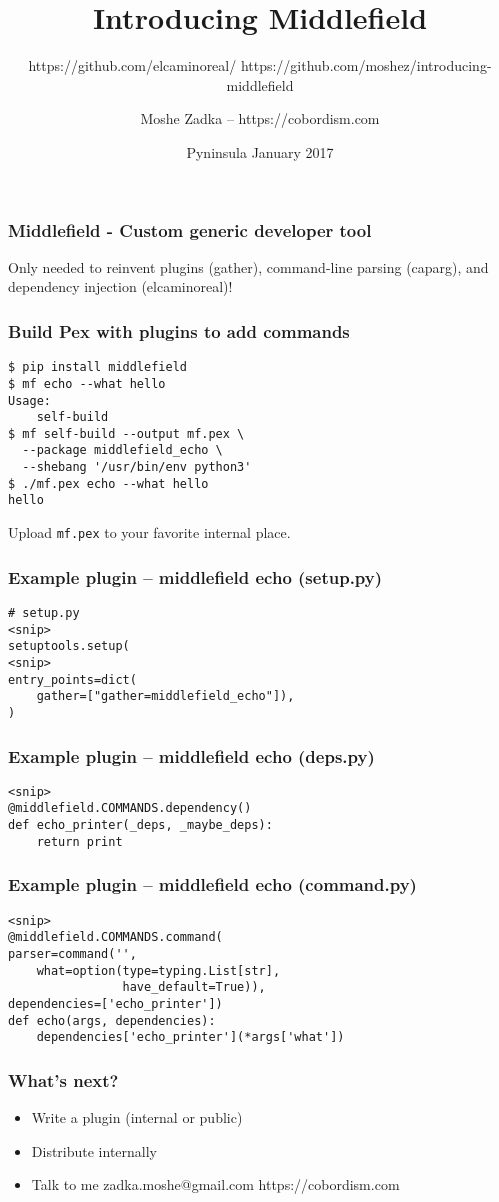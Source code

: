 \documentclass{beamer}
\title{Introducing Middlefield}
\subtitle{https://github.com/elcaminoreal/ https://github.com/moshez/introducing-middlefield}
\author{Moshe Zadka -- https://cobordism.com}
\date{Pyninsula January 2017}
\begin{document}
 
\frame{\titlepage}

\begin{frame}
\frametitle{Middlefield - Custom generic developer tool}
Only needed to reinvent plugins (gather),
command-line parsing (caparg),
and dependency injection (elcaminoreal)!
\end{frame}

\begin{frame}[fragile]
\frametitle{Build Pex with plugins to add commands}
\begin{lstlisting}
$ pip install middlefield
$ mf echo --what hello
Usage:
    self-build
$ mf self-build --output mf.pex \
  --package middlefield_echo \
  --shebang '/usr/bin/env python3'
$ ./mf.pex echo --what hello 
hello
\end{lstlisting}
\pause
Upload \verb|mf.pex| to your favorite internal place.
\end{frame}

\begin{frame}[fragile]
\frametitle{Example plugin -- middlefield echo (setup.py)}
\begin{lstlisting}
# setup.py
<snip>
setuptools.setup(
<snip>
entry_points=dict(
    gather=["gather=middlefield_echo"]),
)
\end{lstlisting}
\end{frame}

\begin{frame}[fragile]
\frametitle{Example plugin -- middlefield echo (deps.py)}
\begin{lstlisting}
<snip>
@middlefield.COMMANDS.dependency()
def echo_printer(_deps, _maybe_deps):
    return print
\end{lstlisting}
\end{frame}

\begin{frame}[fragile]
\frametitle{Example plugin -- middlefield echo (command.py)}
\begin{lstlisting}
<snip>
@middlefield.COMMANDS.command(
parser=command('',
    what=option(type=typing.List[str],
                have_default=True)),
dependencies=['echo_printer'])
def echo(args, dependencies):
    dependencies['echo_printer'](*args['what'])
\end{lstlisting}
\end{frame}

\begin{frame}
\frametitle{What's next?}
\begin{itemize}
\item Write a plugin (internal or public)
\item Distribute internally
\item Talk to me zadka.moshe@gmail.com https://cobordism.com
\end{itemize}
\end{frame}
\end{document}
